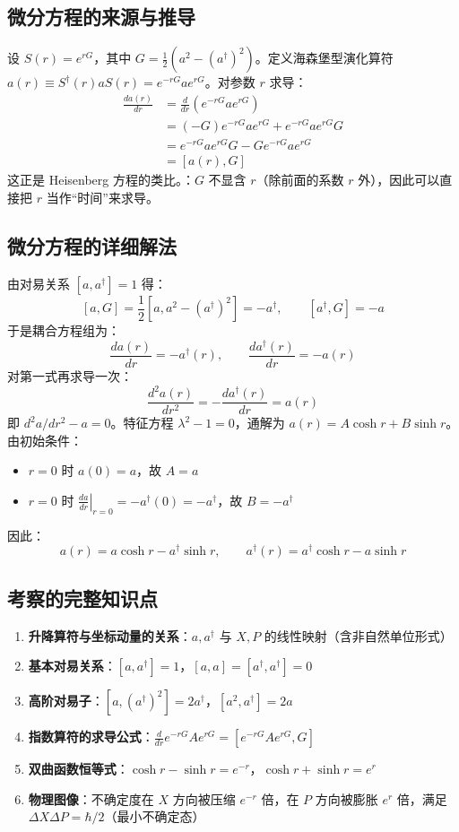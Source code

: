 \subsection{微分方程的来源与推导}

设 $S(r) = e^{rG}$，其中 $G = \frac{1}{2}(a^2 - (a^\dagger)^2)$。定义海森堡型演化算符 $a(r) \equiv S^\dagger(r) a S(r) = e^{-rG} a e^{rG}$。对参数 $r$ 求导：
\begin{align*}
\frac{da(r)}{dr} &= \frac{d}{dr}\left( e^{-rG} a e^{rG} \right) \\
&= (-G) e^{-rG} a e^{rG} + e^{-rG} a e^{rG} G \\
&= e^{-rG} a e^{rG} G - G e^{-rG} a e^{rG} \\
&= [a(r), G]
\end{align*}
这正是 Heisenberg 方程的类比。：$G$ 不显含 $r$（除前面的系数 $r$ 外），因此可以直接把 $r$ 当作``时间''来求导。

\subsection{微分方程的详细解法}

由对易关系 $[a, a^\dagger] = 1$ 得：
\[
[a, G] = \frac{1}{2}\left[ a, a^2 - (a^\dagger)^2 \right] = -a^\dagger, \qquad
[a^\dagger, G] = -a
\]
于是耦合方程组为：
\[
\frac{da(r)}{dr} = -a^\dagger(r), \qquad \frac{da^\dagger(r)}{dr} = -a(r)
\]
对第一式再求导一次：
\[
\frac{d^2 a(r)}{dr^2} = -\frac{da^\dagger(r)}{dr} = a(r)
\]
即 $d^2 a/dr^2 - a = 0$。特征方程 $\lambda^2 - 1 = 0$，通解为 $a(r) = A \cosh r + B \sinh r$。由初始条件：
\begin{itemize}
    \item $r = 0$ 时 $a(0) = a$，故 $A = a$
    \item $r = 0$ 时 $\displaystyle \left.\frac{da}{dr}\right|_{r=0} = -a^\dagger(0) = -a^\dagger$，故 $B = -a^\dagger$
\end{itemize}
因此：
\[
a(r) = a \cosh r - a^\dagger \sinh r, \qquad a^\dagger(r) = a^\dagger \cosh r - a \sinh r
\]

\subsection{考察的完整知识点}

\begin{enumerate}
    \item \textbf{升降算符与坐标动量的关系}：$a, a^\dagger$ 与 $X, P$ 的线性映射（含非自然单位形式）
    \item \textbf{基本对易关系}：$[a, a^\dagger] = 1$，$[a, a] = [a^\dagger, a^\dagger] = 0$
    \item \textbf{高阶对易子}：$[a, (a^\dagger)^2] = 2a^\dagger$，$[a^2, a^\dagger] = 2a$
    \item \textbf{指数算符的求导公式}：$\displaystyle \frac{d}{dr} e^{-rG} A e^{rG} = [e^{-rG} A e^{rG}, G]$
    \item \textbf{双曲函数恒等式}：$\cosh r - \sinh r = e^{-r}$，$\cosh r + \sinh r = e^{r}$
    \item \textbf{物理图像}：不确定度在 $X$ 方向被压缩 $e^{-r}$ 倍，在 $P$ 方向被膨胀 $e^{r}$ 倍，满足 $\Delta X \Delta P = \hbar/2$（最小不确定态）
\end{enumerate}


